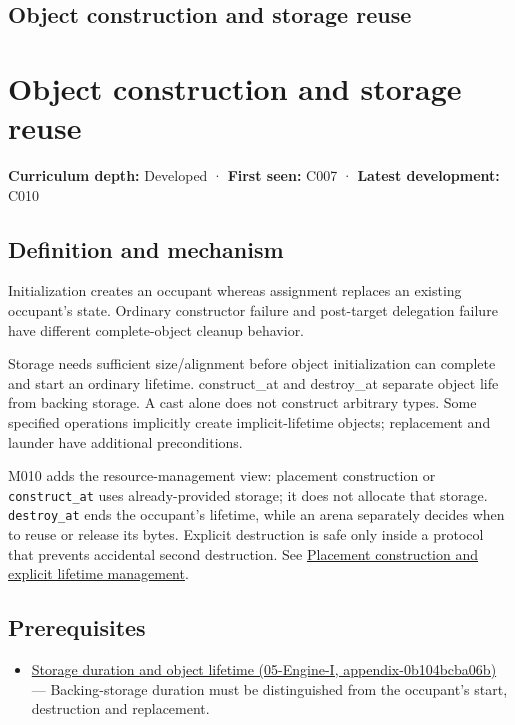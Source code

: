 \hypertarget{appendix-a82f9c438857}{}
\section*{Object construction and storage reuse}
\chapter{Object construction and storage reuse}\label{appendix-a82f9c438857-object-construction-and-storage-reuse}

\textbf{Curriculum depth:} Developed · \textbf{First seen:} C007 · \textbf{Latest development:} C010

\section{Definition and mechanism}\label{appendix-a82f9c438857-definition-and-mechanism}

Initialization creates an occupant whereas assignment replaces an existing occupant's state. Ordinary constructor failure and post-target delegation failure have different complete-object cleanup behavior.

Storage needs sufficient size/alignment before object initialization can complete and start an ordinary lifetime. construct\_at and destroy\_at separate object life from backing storage. A cast alone does not construct arbitrary types. Some specified operations implicitly create implicit-lifetime objects; replacement and launder have additional preconditions.

M010 adds the resource-management view: placement construction or \texttt{construct\_at} uses already-provided storage; it does not allocate that storage. \texttt{destroy\_at} ends the occupant's lifetime, while an arena separately decides when to reuse or release its bytes. Explicit destruction is safe only inside a protocol that prevents accidental second destruction. See \hyperref[appendix-f56c3e43fd4e]{Placement construction and explicit lifetime management}.

\section{Prerequisites}\label{appendix-a82f9c438857-prerequisites}

\begin{itemize}
\tightlist
\item
  \href{../05-Engine-I/main.pdf\#nameddest=appendix-0b104bcba06b}{Storage duration and object lifetime (05-Engine-I, appendix-0b104bcba06b)} --- Backing-storage duration must be distinguished from the occupant's start, destruction and replacement.
\end{itemize}

